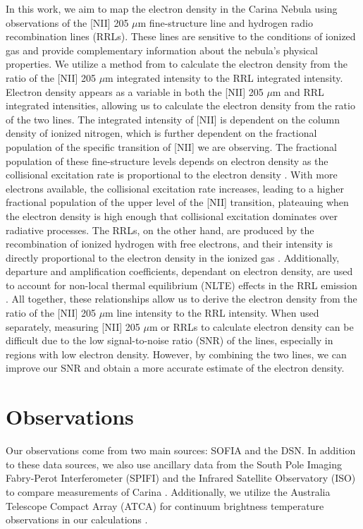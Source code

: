 In this work, we aim to map the electron density in the Carina Nebula using observations of the [NII] 205 $\mu$m fine-structure line and hydrogen radio recombination lines (RRLs). 
These lines are sensitive to the conditions of ionized gas and provide complementary information about the nebula's physical properties. 
We utilize a method from \cite{pineda2019electron} to calculate the electron density from the ratio of the [NII] 205 $\mu$m integrated intensity to the RRL integrated intensity.
Electron density appears as a variable in both the [NII] 205 $\mu$m and RRL integrated intensities, allowing us to calculate the electron density from the ratio of the two lines.
The integrated intensity of [NII] is dependent on the column density of ionized nitrogen, which is further dependent on the fractional population of the specific transition of [NII] we are observing.
The fractional population of these fine-structure levels depends on electron density as the collisional excitation rate is proportional to the electron density \parencite{goldsmith2024electron}.
With more electrons available, the collisional excitation rate increases, leading to a higher fractional population of the upper level of the [NII] transition, plateauing when the electron density is high enough that collisional excitation dominates over radiative processes.
The RRLs, on the other hand, are produced by the recombination of ionized hydrogen with free electrons, and their intensity is directly proportional to the electron density in the ionized gas \parencite{tielens2005physics}.
Additionally, departure and amplification coefficients, dependant on electron density, are used to account for non-local thermal equilibrium (NLTE) effects in the RRL emission \parencite{gordon2002radio}.
All together, these relationships allow us to derive the electron density from the ratio of the [NII] 205 $\mu$m line intensity to the RRL intensity.
When used separately, measuring [NII] 205 $\mu$m or RRLs to calculate electron density can be difficult due to the low signal-to-noise ratio (SNR) of the lines, especially in regions with low electron density.
However, by combining the two lines, we can improve our SNR and obtain a more accurate estimate of the electron density.

\section{Observations}
Our observations come from two main sources: SOFIA and the DSN.
In addition to these data sources, we also use ancillary data from the South Pole Imaging Fabry-Perot Interferometer (SPIFI) and the Infrared Satellite Observatory (ISO) to compare measurements of Carina \parencite{oberst2011205}.
Additionally, we utilize the Australia Telescope Compact Array (ATCA) for continuum brightness temperature observations in our calculations \parencite{Rebolledo_2021}.

